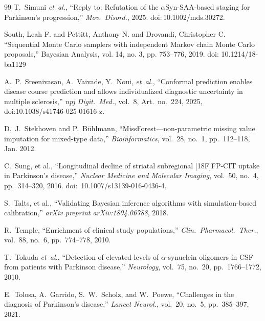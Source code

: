 \begin{thebibliography}{99}
T.~Simuni \textit{et~al.}, ``Reply to: Refutation of the $\alpha$Syn-SAA-based staging for Parkinson's progression,'' \textit{Mov.\ Disord.}, 2025. doi:\,10.1002/mds.30272.

 South, Leah F. and Pettitt, Anthony N. and Drovandi, Christopher C. ``Sequential Monte Carlo samplers with independent Markov chain Monte Carlo proposals,'' Bayesian Analysis, vol. 14, no. 3, pp. 753--776, 2019. doi: 10.1214/18-ba1129

A.~P.~Sreenivasan, A.~Vaivade, Y.~Noui, \textit{et~al.}, ``Conformal prediction enables disease course prediction and allows individualized diagnostic uncertainty in multiple sclerosis,'' \textit{npj Digit.\ Med.}, vol.~8, Art.\ no.~224, 2025, doi:10.1038/s41746-025-01616-z.

D.~J.~Stekhoven and P.~B{\"u}hlmann, ``MissForest---non-parametric missing value imputation for mixed-type data,'' \textit{Bioinformatics}, vol.~28, no.~1, pp.~112--118, Jan. 2012.


C.~Sung, et al., ``Longitudinal decline of striatal subregional [18F]FP-CIT uptake in Parkinson's disease,'' \textit{Nuclear Medicine and Molecular Imaging}, vol.~50, no.~4, pp.~314--320, 2016. doi:~10.1007/s13139-016-0436-4.

S.~Talts, et al., ``Validating Bayesian inference algorithms with simulation-based calibration,'' \textit{arXiv preprint arXiv:1804.06788}, 2018.


R.~Temple, ``Enrichment of clinical study populations,'' \textit{Clin.\ Pharmacol.\ Ther.}, vol.~88, no.~6, pp.~774--778, 2010.

T.~Tokuda \textit{et~al.}, ``Detection of elevated levels of $\alpha$-synuclein oligomers in CSF from patients with Parkinson disease,'' \textit{Neurology}, vol.~75, no.~20, pp.~1766--1772, 2010.

E.~Tolosa, A.~Garrido, S.~W.~Scholz, and W.~Poewe, ``Challenges in the diagnosis of Parkinson's disease,'' \textit{Lancet Neurol.}, vol.~20, no.~5, pp.~385--397, 2021.


\end{thebibliography}
